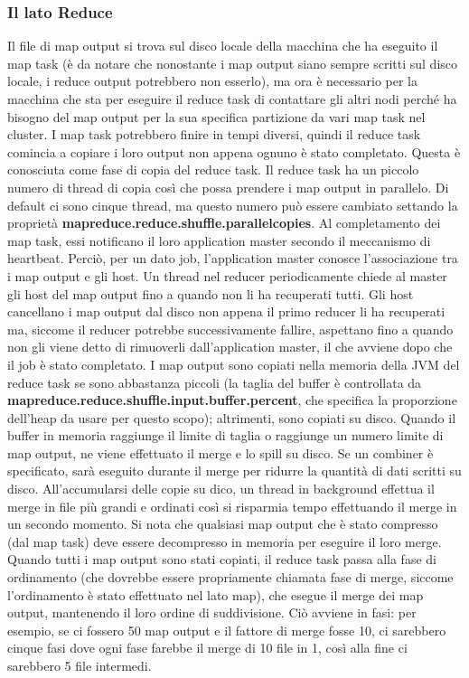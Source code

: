 \subsubsection{Il lato Reduce} 
Il file di map output si trova sul disco locale della macchina che ha eseguito il map task (è da notare che nonostante i map output siano sempre scritti sul disco locale, i reduce output potrebbero non esserlo), ma ora è necessario per la macchina che sta per eseguire il reduce task di contattare gli altri nodi perché ha bisogno del map output per la sua specifica partizione da vari map task nel cluster. I map task potrebbero finire in tempi diversi, quindi il reduce task comincia a copiare i loro output non appena ognuno è stato completato. Questa è conosciuta come fase di copia del reduce task. Il reduce task ha un piccolo numero di thread di copia così che possa prendere i map output in parallelo. Di default ci sono cinque thread, ma questo numero può essere cambiato settando la proprietà \textbf{mapreduce.reduce.shuffle.parallelcopies}. Al completamento dei map task, essi notificano il loro application master secondo il meccanismo di heartbeat. Perciò, per un dato job, l'application master conosce l'associazione tra i map output e gli host. Un thread nel reducer periodicamente chiede al master gli host del map output fino a quando non li ha recuperati tutti. Gli host cancellano i map output dal disco non appena il primo reducer li ha recuperati ma, siccome il reducer potrebbe successivamente fallire, aspettano fino a quando non gli viene detto di rimuoverli dall'application master, il che avviene dopo che il job è stato completato. I map output sono copiati nella memoria della JVM del reduce task se sono abbastanza piccoli (la taglia del buffer è controllata da \textbf{mapreduce.reduce.shuffle.input.buffer.percent}, che specifica la proporzione dell'heap da usare per questo scopo); altrimenti, sono copiati su disco. Quando il buffer in memoria raggiunge il limite di taglia o raggiunge un numero limite di map output, ne viene effettuato il merge e lo spill su disco. Se un combiner è specificato, sarà eseguito durante il merge per ridurre la quantità di dati scritti su disco. All'accumularsi delle copie su dico, un thread in background effettua il merge in file più grandi e ordinati così si risparmia tempo effettuando il merge in un secondo momento. Si nota che qualsiasi map output che è stato compresso (dal map task) deve essere decompresso in memoria per eseguire il loro merge. Quando tutti i map output sono stati copiati, il reduce task passa alla fase di ordinamento (che dovrebbe essere propriamente chiamata fase di merge, siccome l'ordinamento è stato effettuato nel lato map), che esegue il merge dei map output, mantenendo il loro ordine di suddivisione. Ciò avviene in fasi: per esempio, se ci fossero 50 map output e il fattore di merge fosse 10, ci sarebbero cinque fasi dove ogni fase farebbe il merge di 10 file in 1, così alla fine ci sarebbero 5 file intermedi.
